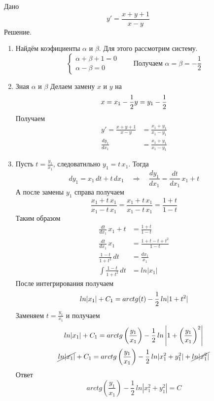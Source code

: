 \begin{Example}
    Дано
    \[
        y' = \frac{x + y + 1}{x - y}
    \]
    Решение.
    \begin{enumerate}
        \item Найдём коэфициенты $\alpha$ и $\beta$. Для этого рассмотрим систему.
        \[
            \begin{cases}
                \alpha + \beta + 1 = 0\\
                \alpha - \beta = 0
            \end{cases} \qquad \text{Получаем } \alpha = \beta = -\frac{1}{2}
        \]
        
        \item Зная $\alpha$ и $\beta$ Делаем замену $x$ и $y$ на
        \[
            x = x_1 - \frac{1}{2}\\            
            y = y_1 - \frac{1}{2}
        \]
        Получаем
        \begin{align*}
            y' = \frac{x + y + 1}{x - y} &= \frac{x_1 + y_1}{x_1 - y_1}\\
            \frac{dy_1}{dx_1} &= \frac{x_1 + y_1}{x_1 - y_1}
        \end{align*}
        
        \item Пусть $t = \frac{y_1}{x_1}$, следоватнльно $y_1 = t\,x_1$. Тогда 
        \[
            dy_1 = x_1\,dt + t\,dx_1 \quad \Rightarrow \quad \frac{dy_1}{dx_1} = \frac{dt}{dx_1}\,x_1 + t
        \]
        А после замены $y_1$ справа получаем
        \[
            \frac{x_1 + t\,x_1}{x_1 - t\,x_1} = \frac{x_1 + t\,x_1}{x_1 - t\,x_1} = \frac{1 + t}{1 - t}
        \]
        Таким образом
        \begin{align*}
            \frac{dt}{dx_1}\,x_1 + t &= \frac{1 + t}{1 - t}\\
            \frac{dt}{dx_1}\,x_1 &= \frac{1 + t - t + t^2}{1 - t}\\
            \frac{1 - t}{1 + t^2}\,dt &= \frac{dx_1}{x_1}\\
            \int \frac{1 - t}{1 + t^2}\,dt &= ln|x_1|
        \end{align*}
        После интегрирования получаем
        \[
            ln|x_1| + C_1 = arctg(t) - \frac{1}{2}\,ln|1 + t^2|\\
        \]
        Заменяем $t = \frac{y_1}{x_1}$ и получаем
        \begin{gather*}
            ln|x_1| + C_1 = arctg\left(\frac{y_1}{x_1}\right) - \frac{1}{2}\,ln\left|1 + \left(\frac{y_1}{x_1}\right)^2\right|\\
            \cancel{ln|x_1|} + C_1 = arctg\left(\frac{y_1}{x_1}\right) - \frac{1}{2}\,ln|x_1^2 + y_1^2| + \cancel{ln|x_1^2|}\\
        \end{gather*}
        Ответ
        \[
            arctg\left(\frac{y_1}{x_1}\right) - \frac{1}{2}\,ln|x_1^2 + y_1^2| = C
        \]
    \end{enumerate}
\end{Example}